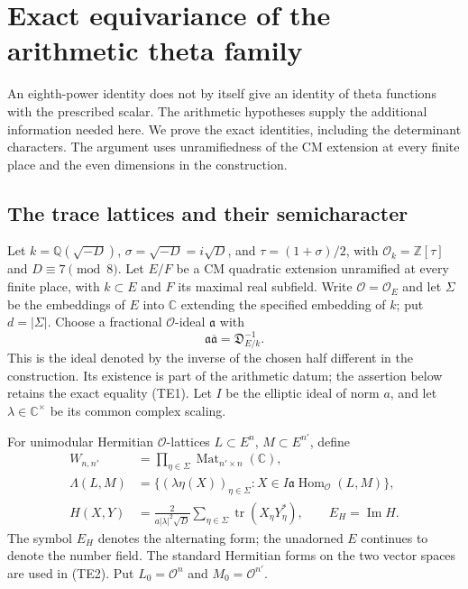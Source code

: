 \section{Exact equivariance of the arithmetic theta family}
\label{te-section}

An eighth-power identity does not by itself give an identity of
theta functions with the prescribed scalar.  The arithmetic
hypotheses supply the additional information needed here.  We
prove the exact identities, including the determinant characters.
The argument uses unramifiedness of the CM extension at every
finite place and the even dimensions in the construction.

\subsection{The trace lattices and their semicharacter}

Let $k=\mathbb Q(\sqrt{-D})$, $\sigma=\sqrt{-D}=i\sqrt D$,
and $\tau=(1+\sigma)/2$, with
$\mathcal O_k=\mathbb Z[\tau]$ and $D\equiv7\pmod8$.
Let $E/F$ be a CM quadratic extension unramified at every
finite place, with $k\subset E$ and $F$ its maximal real
subfield.  Write $\mathcal O=\mathcal O_E$ and let $\Sigma$
be the embeddings of $E$ into $\mathbb C$ extending the
specified embedding of $k$; put $d=|\Sigma|$.
Choose a fractional $\mathcal O$-ideal $\mathfrak a$ with
\[
          \mathfrak a\overline{\mathfrak a}
                         =\mathfrak D_{E/k}^{-1}.
 \tag{TE1}
\]
This is the ideal denoted by the inverse of the chosen half
different in the construction.  Its existence is part of the
arithmetic datum; the assertion below retains the exact equality
(TE1).  Let $I$ be the elliptic ideal of norm $a$, and let
$\lambda\in\mathbb C^\times$ be its common complex scaling.

For unimodular Hermitian $\mathcal O$-lattices
$L\subset E^n$, $M\subset E^{n'}$, define
\[
 \begin{split}
 W_{n,n'}&=\prod_{\eta\in\Sigma}
                      \operatorname{Mat}_{n'\times n}(\mathbb C),\\
 \Lambda(L,M)&=\{(\lambda\eta(X))_{\eta\in\Sigma}:
             X\in I\mathfrak a\operatorname{Hom}_{\mathcal O}(L,M)\},\\
 H(X,Y)&=\frac{2}{a|\lambda|^2\sqrt D}
                  \sum_{\eta\in\Sigma}\operatorname{tr}(X_\eta Y_\eta^*),
       \qquad E_H=\operatorname{Im}H.
 \end{split}
 \tag{TE2}
\]
The symbol $E_H$ denotes the alternating form; the unadorned
$E$ continues to denote the number field.  The standard
Hermitian forms on the two vector spaces are used in (TE2).
Put $L_0=\mathcal O^n$ and $M_0=\mathcal O^{n'}$.

